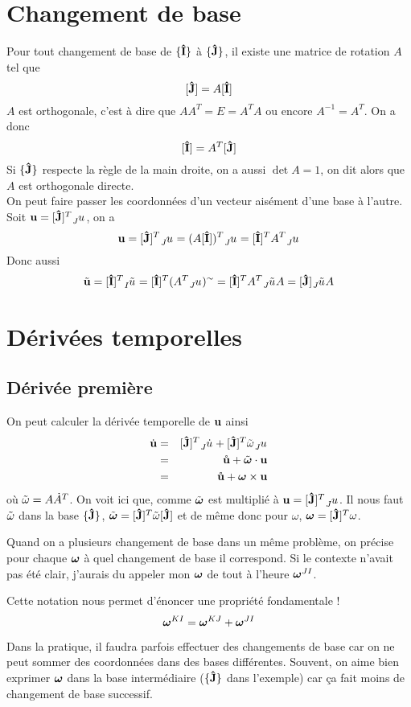 \section{Changement de base}
Pour tout changement de base de $\{{\bf\hat{I}}\}$ à $\{{\bf\hat{J}}\}$, il existe une matrice de rotation $A$ tel que
\[ [{\bf\hat{J}}] = A [{\bf\hat{I}}] \]
$A$ est orthogonale, c'est à dire que $AA^T = E = A^TA$ ou encore $A^{-1} = A^T$.
On a donc
\[ [{\bf\hat{I}}] = A^T [{\bf\hat{J}}] \]
Si $\{{\bf\hat{J}}\}$ respecte la règle de la main droite, on a aussi $\det A = 1$, on dit alors que $A$ est orthogonale directe.\\
On peut faire passer les coordonnées d'un vecteur aisément d'une base à l'autre.
Soit $\fv{u} = [\uj]^T \wrt{J}{u}$, on a
\[ \fv{u} = [\uj]^T \wrt{J}{u} = (A[\ui])^T \wrt{J}{u} = [\ui]^TA^T \wrt{J}{u} \]
Donc aussi
\[ \tilde{\fv{u}} = [\ui]^T \wrt{I}{\tilde{u}} = [\ui]^T (A^T \wrt{J}{u})^{\sim} = [\ui]^T A^T \wrt{J}{\tilde{u}} A = [\uj] \wrt{J}{\tilde{u}} A \]

\section{Dérivées temporelles}

\subsection{Dérivée première}
On peut calculer la dérivée temporelle de ${\bf u}$ ainsi
\begin{eqnarray*}
	\fvd{u} &=& [\uj]^T \wrt{J}{\dot{u}} + [\uj]^T \omegat\wrt{J}{u}\\
	&=& \fvr{u} + \omegaft \cdot \fv{u}\\
	&=& \fvr{u} + \omegaf \times \fv{u}
\end{eqnarray*}
où $\tilde{\omega} = A\dot{A}^T$.
On voit ici que, comme $\tilde{\bm \omega}$ est multiplié à $\fv{u} = [\uj]^T \wrt{J}{u}$.
Il nous faut $\tilde{\omega}$ dans la base $\{{\bf\hat{J}}\}$, $\tilde{\bm \omega} = [{\bf\hat{J}}]^T \tilde{\omega} [{\bf\hat{J}}]$ et de même donc pour $\omega$, ${\bm \omega} = [{\bf\hat{J}}]^T \omega$.

Quand on a plusieurs changement de base dans un même problème, on précise pour chaque ${\bm \omega}$ à quel changement de base il correspond.
Si le contexte n'avait pas été clair, j'aurais du appeler mon ${\bm \omega}$ de tout à l'heure ${\bm \omega}^{JI}$.

Cette notation nous permet d'énoncer une propriété fondamentale !
\[ {\bm \omega}^{KI} = {\bm \omega}^{KJ} + {\bm \omega}^{JI} \]

Dans la pratique, il faudra parfois effectuer des changements de base car on ne peut sommer des coordonnées dans des bases différentes.
Souvent, on aime bien exprimer ${\bm \omega}$ dans la base intermédiaire ($\{{\bf\hat{J}}\}$ dans l'exemple) car ça fait moins de changement de base successif.

